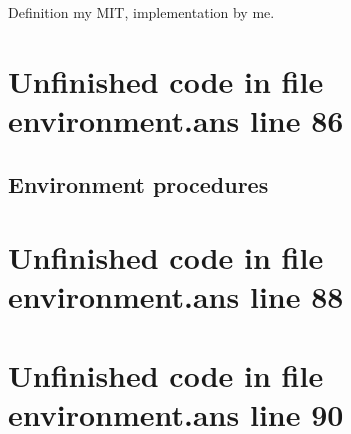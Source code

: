 \documentclass[twoside,9pt]{report}
\begin{document}
Definition my MIT, implementation by me.

\section{Unfinished code in file environment.ans line 86}
\subsection{Environment procedures}
\label{environment-procedures}
\section{Unfinished code in file environment.ans line 88}
\section{Unfinished code in file environment.ans line 90}
\end{document}
